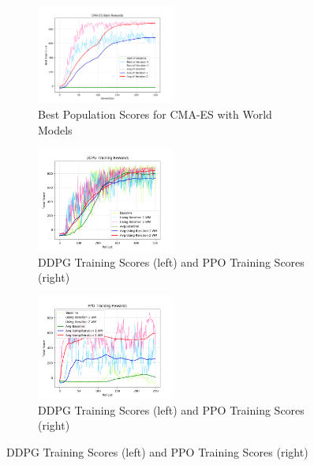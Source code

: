 \begin{figure}[!ht]
	\begin{subfigure}{}
		\centering
		\includegraphics[width=0.50\textwidth]{images/WM4.png}\caption{Best Population Scores for CMA-ES with World Models}\label{fig:wm}
	\end{subfigure}
	\begin{subfigure}{}
		\centering
		\includegraphics[width=0.50\textwidth]{images/DDPG3.png}\caption{DDPG Training Scores (left) and PPO Training Scores (right)}\label{fig:rl1} 
	\end{subfigure}
	\begin{subfigure}{}
		\centering
		\includegraphics[width=0.50\textwidth]{images/PPO3.png}\caption{DDPG Training Scores (left) and PPO Training Scores (right)}\label{fig:rl2} 
	\end{subfigure}
\end{figure}

